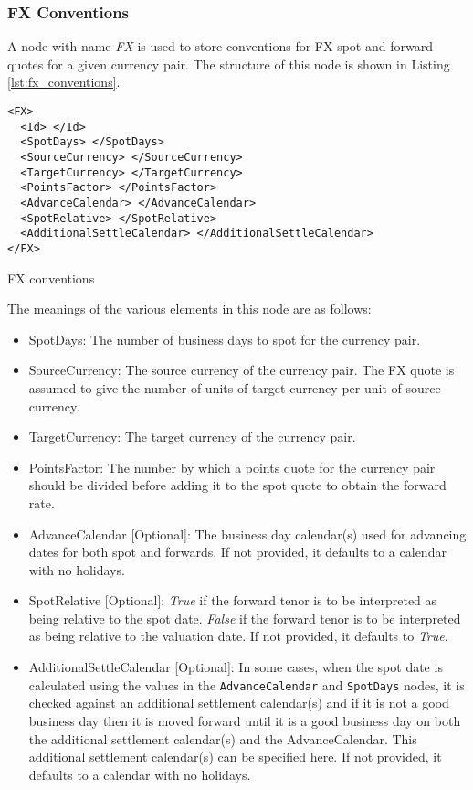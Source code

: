 \subsubsection{FX Conventions}
A node with name \emph{FX} is used to store conventions for FX spot and forward quotes for a given currency pair. The
structure of this node is shown in Listing \ref{lst:fx_conventions}.

\begin{listing}[H]
\begin{verbatim}
<FX>
  <Id> </Id>
  <SpotDays> </SpotDays>
  <SourceCurrency> </SourceCurrency>
  <TargetCurrency> </TargetCurrency>
  <PointsFactor> </PointsFactor>
  <AdvanceCalendar> </AdvanceCalendar>
  <SpotRelative> </SpotRelative>
  <AdditionalSettleCalendar> </AdditionalSettleCalendar>
</FX>
\end{verbatim}
\caption{FX conventions}
\label{lst:fx_conventions}
\end{listing}


The meanings of the various elements in this node are as follows:
\begin{itemize}
\item SpotDays: The number of business days to spot for the currency pair.
\item SourceCurrency: The source currency of the currency pair. The FX quote is assumed to give the number of units of
target currency per unit of source currency.
\item TargetCurrency: The target currency of the currency pair.
\item PointsFactor: The number by which a points quote for the currency pair should be divided before adding it to the
spot quote to obtain the forward rate.
\item AdvanceCalendar [Optional]: The business day calendar(s) used for advancing dates for both spot and forwards. If
not provided, it defaults to a calendar with no holidays.
\item SpotRelative [Optional]: \emph{True} if the forward tenor is to be interpreted as being relative to the spot date.
\emph{False} if the forward tenor is to be interpreted as being relative to the valuation date. If not provided, it
defaults to \emph{True}.
\item AdditionalSettleCalendar [Optional]: In some cases, when the spot date is calculated using the values in the
\lstinline!AdvanceCalendar! and \lstinline!SpotDays! nodes, it is checked against an additional settlement calendar(s)
and if it is not a good business day then it is moved forward until it is a good business day on both the additional
settlement calendar(s) and the AdvanceCalendar. This additional settlement calendar(s) can be specified here. If not
provided, it defaults to a calendar with no holidays.
\end{itemize}

